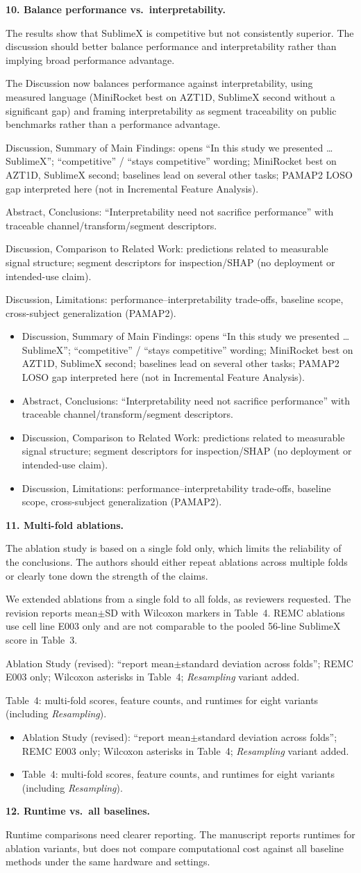 \documentclass[11pt]{article}
\makeatletter
\newcommand{\rsp}{\par\vspace{0.9em}}
\newcommand{\rcitem}[2]{\begin{reviewerbox}\textbf{#1}\par\smallskip#2\end{reviewerbox}}
\newcommand{\response}[2]{%
  \begin{responsebox}#1%
  \def\@responseitems{#2}%
  \ifx\@responseitems\empty\else\begin{itemize}[nosep,leftmargin=1.2em]#2\end{itemize}\fi
  \end{responsebox}\rsp}
\makeatother
\begin{document}
\rcitem{10. Balance performance vs.\ interpretability.}{The results show that SublimeX is
competitive but not consistently superior. The discussion should better balance performance and
interpretability rather than implying broad performance advantage.}

\response{The Discussion now balances performance against interpretability, using measured language
(MiniRocket best on AZT1D, SublimeX second without a significant gap) and framing interpretability
as segment traceability on public benchmarks rather than a performance advantage.}{
  \item Discussion, Summary of Main Findings: opens ``In this study we presented \ldots{}
    SublimeX''; ``competitive'' / ``stays competitive'' wording; MiniRocket best on AZT1D,
    SublimeX second; baselines lead on several other tasks; PAMAP2 LOSO gap interpreted here
    (not in Incremental Feature Analysis).
  \item Abstract, Conclusions: ``Interpretability need not sacrifice performance'' with traceable
    channel/transform/segment descriptors.
  \item Discussion, Comparison to Related Work: predictions related to measurable signal structure;
    segment descriptors for inspection/SHAP (no deployment or intended-use claim).
  \item Discussion, Limitations: performance--interpretability trade-offs, baseline scope,
    cross-subject generalization (PAMAP2).
}

\rcitem{11. Multi-fold ablations.}{The ablation study is based on a single fold only, which limits
the reliability of the conclusions. The authors should either repeat ablations across multiple
folds or clearly tone down the strength of the claims.}

\response{We extended ablations from a single fold to all folds, as reviewers requested.
The revision reports mean$\pm$SD with Wilcoxon markers in Table~4. REMC ablations use cell line
E003 only and are not comparable to the pooled 56-line SublimeX score in Table~3. }{
  \item Ablation Study (revised): ``report mean$\pm$standard deviation across folds''; REMC E003
    only; Wilcoxon asterisks in Table~4; \emph{Resampling} variant added.
  \item Table~4: multi-fold scores, feature counts, and runtimes for eight variants (including
    \emph{Resampling}).
}

\rcitem{12. Runtime vs.\ all baselines.}{Runtime comparisons need clearer reporting. The
manuscript reports runtimes for ablation variants, but does not compare computational cost against
all baseline methods under the same hardware and settings.}
\end{document}
